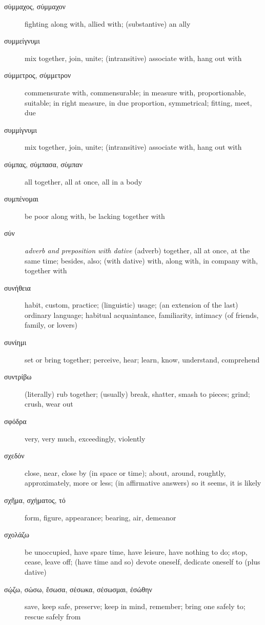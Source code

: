 \documentclass[12pt,letterpaper]{article}
\begin{document}
\begin{description}
    \item[\textgreek{σύμμαχος, σύμμαχον}] \marginnote{*}fighting along with, allied with; (substantive) an ally
    \item[\textgreek{συμμείγνυμι}] mix together, join, unite; (intransitive) associate with, hang out with
    \item[\textgreek{σύμμετρος, σύμμετρον}] commensurate with, commensurable; in measure with, proportionable, suitable; in right measure, in due proportion, symmetrical; fitting, meet, due
    \item[\textgreek{συμμίγνυμι}] mix together, join, unite; (intransitive) associate with, hang out with
    \item[\textgreek{σύμπας, σύμπασα, σύμπαν}] all together, all at once, all in a body
    \item[\textgreek{συμπένομαι}] be poor along with, be lacking together with
    \item[\textgreek{σύν}] \marginnote{*}\textit{adverb and preposition with dative} (adverb) together, all at once, at the same time; besides, also; (with dative) with, along with, in company with, together with
    \item[\textgreek{συνήθεια}] habit, custom, practice; (linguistic) usage; (an extension of the last) ordinary language; habitual acquaintance, familiarity, intimacy (of friends, family, or lovers)
    \item[\textgreek{συνίημι}] set or bring together; perceive, hear; learn, know, understand, comprehend
    \item[\textgreek{συντρίβω}] (literally) rub together; (usually) break, shatter, smash to pieces; grind; crush, wear out
    \item[\textgreek{σφόδρα}] very, very much, exceedingly, violently
    \item[\textgreek{σχεδόν}] close, near, close by (in space or time); about, around, roughtly, approximately, more or less; (in affirmative answers) so it seems, it is likely
    \item[\textgreek{σχῆμα, σχήματος, τό}] \marginnote{*}form, figure, appearance; bearing, air, demeanor
    \item[\textgreek{σχολάζω}] be unoccupied, have spare time, have leisure, have nothing to do; stop, cease, leave off; (have time and so) devote oneself, dedicate oneself to (plus dative)
    \item[\textgreek{σῴζω, σώσω, ἔσωσα, σέσωκα, σέσωσμαι, ἐσώθην}] save, keep safe, preserve; keep in mind, remember; bring one safely to; rescue safely from

\end{description}
\end{document}
